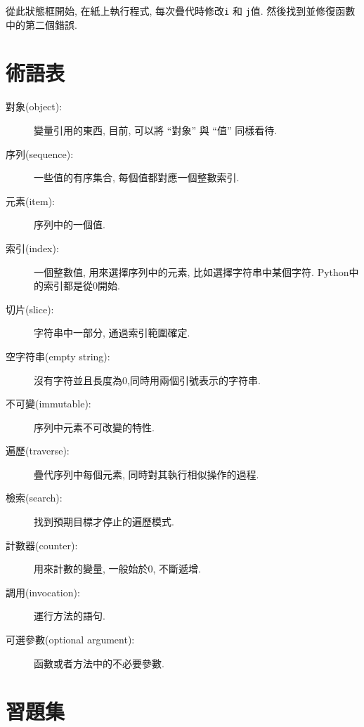 \documentclass[10pt]{book}
\begin{document}
從此狀態框開始, 在紙上執行程式, 每次疊代時修改{\tt i} 和 {\tt j}值. 
然後找到並修復函數中的第二個錯誤. 
\label{isreverse}


\section{術語表}

\begin{description}

\item[對象(object):] 變量引用的東西, 目前, 可以將
``對象'' 與 ``值'' 同樣看待. 

\item[序列(sequence):] 一些值的有序集合, 每個值都對應一個整數索引. 

\item[元素(item):] 序列中的一個值.

\item[索引(index):] 一個整數值, 用來選擇序列中的元素, 
比如選擇字符串中某個字符. Python中的索引都是從0開始. 

\item[切片(slice):] 字符串中一部分, 通過索引範圍確定. 

\item[空字符串(empty string):] 沒有字符並且長度為0,同時用兩個引號表示的字符串. 

\item[不可變(immutable):] 序列中元素不可改變的特性. 

\item[遍歷(traverse):] 疊代序列中每個元素, 同時對其執行相似操作的過程. 

\item[檢索(search):] 找到預期目標才停止的遍歷模式. 

\item[計數器(counter):] 用來計數的變量, 一般始於0, 不斷遞增. 

\item[調用(invocation):] 運行方法的語句.

\item[可選參數(optional argument):] 函數或者方法中的不必要參數. 

\end{description}


\section{習題集}
\end{document}
